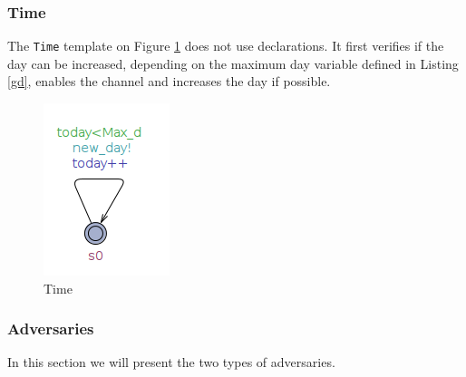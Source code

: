 \documentclass[a4paper, twocolumn]{article}
\begin{document}
\subsubsection{Time}
The \texttt{Time} template on Figure \ref{fig:time} does not use declarations. It first verifies if the day can be increased, depending on the maximum day variable defined in Listing \ref{gd}, enables the channel and increases the day if possible.
\begin{figure}[H]
    \centering
    \includegraphics[scale=0.5]{images/day.png}
    \caption{Time}
    \label{fig:time} 
\end{figure}

\subsubsection{Adversaries}
In this section we will present the two types of adversaries.
\end{document}
